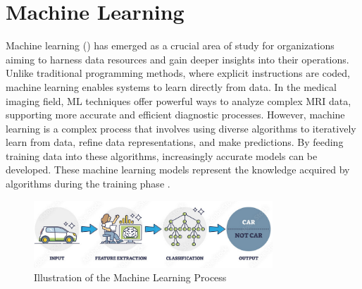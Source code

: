 \section{Machine Learning}
\label{sec:ml}
Machine learning () has emerged as a crucial area of study for organizations aiming to harness data resources and gain deeper insights into their operations. Unlike traditional programming methods, where explicit instructions are coded, machine learning enables systems to learn directly from data. In the medical imaging field, ML techniques offer powerful ways to analyze complex MRI data, supporting more accurate and efficient diagnostic processes. However, machine learning is a complex process that involves using diverse algorithms to iteratively learn from data, refine data representations, and make predictions. By feeding training data into these algorithms, increasingly accurate models can be developed. These machine learning models represent the knowledge acquired by algorithms during the training phase \cite{hurwitz2018mlfd}.

\begin{figure}[H]
  \centering
  \includegraphics[width=0.8\textwidth]{Images/Chapter1/ml.png}
  \caption{Illustration of the Machine Learning Process \cite{alltius2025deeplearning}}
  \label{fig:ml}
\end{figure}



